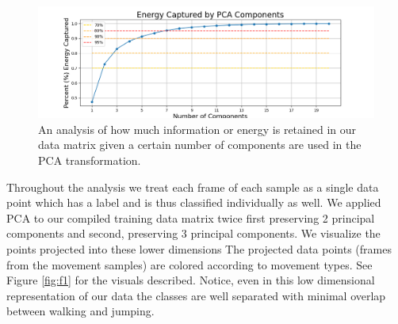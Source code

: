 \documentclass[11pt]{amsart}
\begin{document}
\begin{figure}[h]
	\centering
	\includegraphics[width=.5\textwidth]{../visualizations/energy_by_components.png}
 	\caption{An analysis of how much information or energy is retained in our data matrix given a certain number of components are used in the PCA transformation.}\label{fig:f0}
\end{figure}

Throughout the analysis we treat each frame of each sample as a single data point which has a label and is thus classified individually as well.
We applied PCA to our compiled training data matrix twice first preserving 2 principal components and second, preserving 3 principal components.
We visualize the points projected into these lower dimensions
The projected data points (frames from the movement samples) are colored according to movement types.
See Figure \ref{fig:f1} for the visuals described.
Notice, even in this low dimensional representation of our data the classes are well separated with minimal overlap between walking and jumping.
\end{document}
